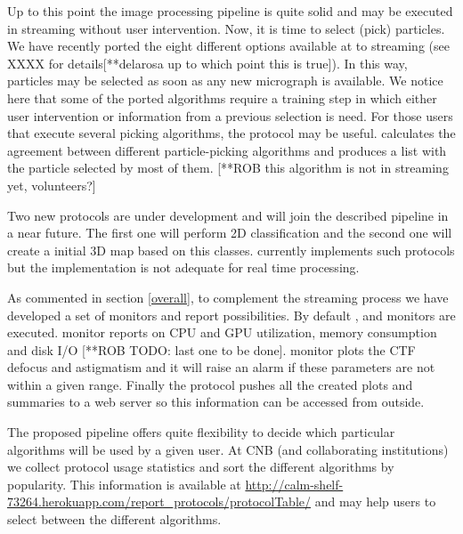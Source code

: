 Up to this point the image processing pipeline is quite solid and may be executed in streaming without user intervention. Now, it is time to select (pick) particles. We have recently ported the eight different options available at \scipion  to streaming (see XXXX for details[**delarosa up to which point this is true]). In this way,  particles may be selected as soon as any new micrograph is available. We notice here that some of the ported algorithms require a training step in which either user intervention or information from a previous selection is need. For those users that execute several picking algorithms, the protocol  may be useful.   calculates the agreement between different particle-picking algorithms and produces a list with the particle selected by most of them. [**ROB this algorithm is not in streaming yet, volunteers?]

Two new protocols are under development and will join the described  pipeline in a near future. The first one will perform 2D classification and the second one will create a initial 3D map based on this classes. \scipion currently implements such protocols but the implementation is not adequate for real time processing.

As commented in section \ref{overall}, to complement the streaming process we have developed a set of monitors and report possibilities. By default ,  and  monitors are executed.  monitor reports on  CPU and GPU utilization, memory consumption and disk I/O [**ROB TODO: last one to be done].  monitor plots the CTF defocus and astigmatism  and it will raise an alarm if these parameters are not within a given range. Finally the  protocol pushes all the created plots and summaries to a web server 
so this information can be accessed from outside.

The proposed pipeline offers quite flexibility to decide which particular algorithms will be used by a given user. At CNB (and collaborating institutions) we collect protocol usage statistics and sort the different algorithms by popularity.  This information is available at  \url{http://calm-shelf-73264.herokuapp.com/report_protocols/protocolTable/} and may help users to select   between the different algorithms.

